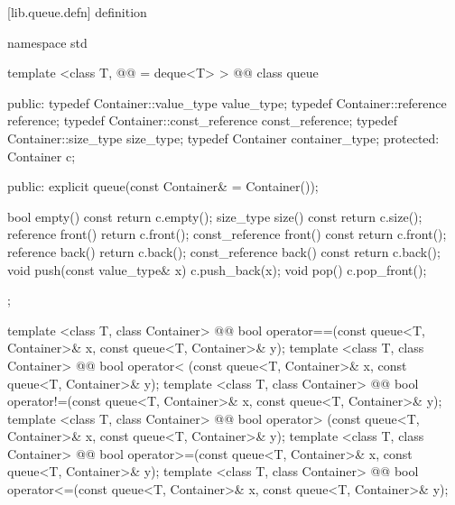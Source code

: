\documentclass[american,twoside]{book}
\begin{document}
[lib.queue.defn]{ definition}

\begin{codeblock}
namespace std {
  template <class T, @@ = deque<T> >
  @@
  class queue {
  public:
    typedef Container::value_type            value_type;
    typedef Container::reference             reference;
    typedef Container::const_reference       const_reference;
    typedef Container::size_type             size_type;
    typedef Container                        container_type;
  protected:
    Container c;

  public:
    explicit queue(const Container& = Container());

    bool              empty() const     { return c.empty(); }
    size_type         size()  const     { return c.size(); }
    reference         front()           { return c.front(); }
    const_reference   front() const     { return c.front(); }
    reference         back()            { return c.back(); }
    const_reference   back() const      { return c.back(); }
    void push(const value_type& x)      { c.push_back(x); }
    void pop()                          { c.pop_front(); }
  };

  template <class T, class Container>
    @@
    bool operator==(const queue<T, Container>& x,
                    const queue<T, Container>& y);
  template <class T, class Container>
    @@
    bool operator< (const queue<T, Container>& x,
                    const queue<T, Container>& y);
  template <class T, class Container>
    @@
    bool operator!=(const queue<T, Container>& x,
                    const queue<T, Container>& y);
  template <class T, class Container>
    @@
    bool operator> (const queue<T, Container>& x,
                    const queue<T, Container>& y);
  template <class T, class Container>
    @@
    bool operator>=(const queue<T, Container>& x,
                    const queue<T, Container>& y);
  template <class T, class Container>
    @@
    bool operator<=(const queue<T, Container>& x,
                    const queue<T, Container>& y);
}
\end{codeblock}
\end{document}
